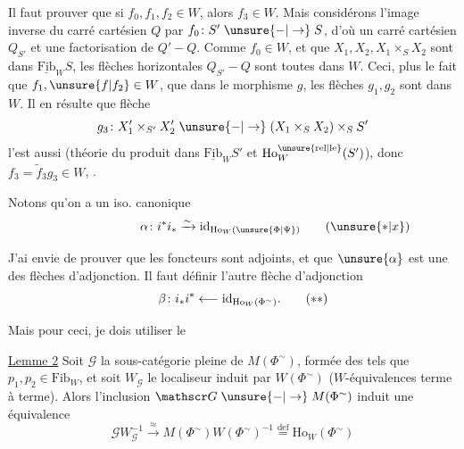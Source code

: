 Il faut prouver que si $f_0,f_1,f_2\in W$, alors $f_3\in W$. Mais considérons l'image inverse du carré cartésien $Q$ par $f_0\colon S'\mathrel{\unsure{-|\to}}S$, d'où un carré cartésien $Q_{S'}$ et une factorisation
de $Q'\mathrel{-}Q$. Comme $f_0\in W$, et que $X_1,X_2,X_1\times_S X_2$ sont dans $\underline{\mathrm{Fib}}_W S$, les flèches horizontales  $Q_{S'}\mathrel{-}Q$ sont toutes dans $W$. Ceci, plus le fait que $f_1,\unsure{f|f_2}\in W$,  que dans le morphisme $g$, les flèches $g_1,g_2$ sont dans $W$. Il en résulte que  flèche
\[
g_3\colon X'_1\times_{S'}X'_2\mathrel{\unsure{-|\to}}(X_1\times_S X_2)\times_S S'
\]
l'est aussi (théorie du produit dans $\underline{\mathrm{Fib}}_W S'$ et $\mathrm{Ho}^{\unsure{\mathrm{rel}|\mathrm{le}}}_W(S')$), donc $f_3=\widetilde f_3g_3\in W$, .

Notons qu'on a un iso. canonique
\[
\alpha\colon i^*i_*\xrightarrow{\sim}\mathrm{id}_{\mathrm{Ho}_W(\unsure{\Phi|\Psi})}\tag*{\makebox[0pt][r]{\makebox[\displaywidth][l]{$(\unsure{*|x})$}}}
\]

J'ai envie de prouver que les foncteurs
sont adjoints, et que $\unsure{\alpha}$ est une des flèches d'adjonction. Il faut définir l'autre flèche d'adjonction
\[
\beta\colon i_*i^*\longleftarrow\mathrm{id}_{\mathrm{Ho}_W(\Phi^{\sim})}.\tag*{\makebox[0pt][r]{\makebox[\displaywidth][l]{$(**)$}}}
\]

Mais pour ceci, je dois utiliser le

\uline{Lemme 2} Soit $\mathscr G$ la sous-catégorie pleine de $M(\Phi^{\sim})$, formée des
tels que $p_1,p_2\in\mathrm{Fib}_W$, et soit $W_{\mathscr G}$ le localiseur induit par $W(\Phi^{\sim})$ ($W$-équivalences terme à terme). Alors l'inclusion $\mathscr G\mathrel{\unsure{-|\to}}M(\Phi^{\sim})$ induit une équivalence
\[
\mathscr G W_{\mathscr G}^{-1}\xrightarrow{\approx}M(\Phi^{\sim})W(\Phi^{\sim})^{-1}
\mathrel{\overset{\mathrm{def}}{=}}\mathrm{Ho}_W(\Phi^{\sim})
\]

